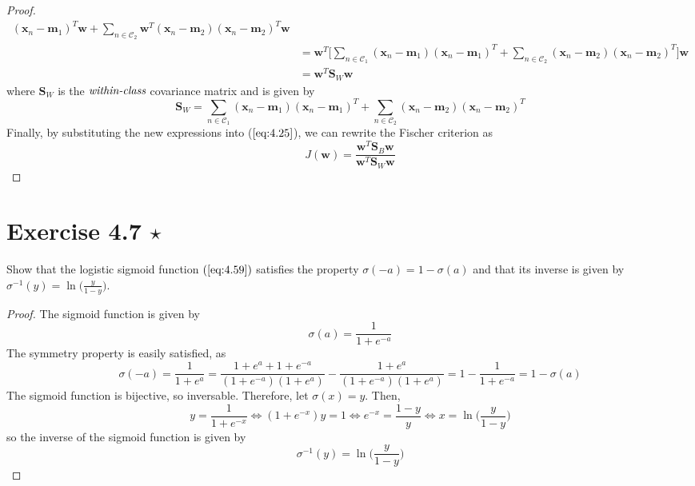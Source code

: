 \begin{proof}
\begin{align*}
            (\mathbf{x}_n - \mathbf{m}_1)^T\mathbf{w}
            + \sum_{n \in \mathcal{C}_2} \mathbf{w}^T(\mathbf{x}_n - \mathbf{m}_2)
            (\mathbf{x}_n - \mathbf{m}_2)^T\mathbf{w} \\
        &= \mathbf{w}^T \bigg[\sum_{n \in \mathcal{C}_1} 
            (\mathbf{x}_n - \mathbf{m}_1)(\mathbf{x}_n - \mathbf{m}_1)^T
            + \sum_{n \in \mathcal{C}_2}  
            (\mathbf{x}_n - \mathbf{m}_2)(\mathbf{x}_n - \mathbf{m}_2)^T
            \bigg]\mathbf{w} \\
        &= \mathbf{w}^T\mathbf{S}_W\mathbf{w}
    \end{align*}
    where $\mathbf{S}_W$ is the $\emph{within-class}$ covariance matrix and is given by
    \begin{equation*}
        \mathbf{S}_W = 
           \sum_{n \in \mathcal{C}_1} 
            (\mathbf{x}_n - \mathbf{m}_1)(\mathbf{x}_n - \mathbf{m}_1)^T
            + \sum_{n \in \mathcal{C}_2}  
            (\mathbf{x}_n - \mathbf{m}_2)(\mathbf{x}_n - \mathbf{m}_2)^T
        \tag{4.28}\label{eq:4.28}
    \end{equation*}
    Finally, by substituting the new expressions into ($\ref{eq:4.25}$), we can rewrite
    the Fischer criterion as
    \begin{equation*}
        J(\mathbf{w}) = \frac{\mathbf{w}^T\mathbf{S}_B\mathbf{w}}{\mathbf{w}^T\mathbf{S}_W\mathbf{w}}
        \tag{4.26}\label{eq:4.26}
    \end{equation*}
\end{proof}

\section*{Exercise 4.7 $\star$}
Show that the logistic sigmoid function $(\ref{eq:4.59})$ satisfies the property
$\sigma(-a) = 1 - \sigma(a)$ and that its inverse is given by 
$\sigma^{-1}(y) = \ln\bigg(\displaystyle \frac{y}{1 - y}\bigg)$. 

\vspace{1em}

\begin{proof}
    The sigmoid function is given by
    \begin{equation*}
        \sigma(a) = \frac{1}{1 + e^{-a}}
        \tag{4.59}\label{eq:4.59}
    \end{equation*}
    The symmetry property is easily satisfied, as
    \begin{equation*}
        \sigma(-a) 
        = \frac{1}{1 + e^a} 
        = \frac{1 + e^a + 1 + e^{-a}}{(1 + e^{-a})(1 + e^a)}
        - \frac{1 + e^a}{(1 + e^{-a})(1 + e^a)}
        = 1 - \frac{1}{1 + e^{-a}} 
        = 1 - \sigma(a)
        \tag{4.60}\label{eq:4.60}
    \end{equation*}
    The sigmoid function is bijective, so inversable. Therefore, let $\sigma(x) = y$.
    Then,
    \[
        y = \frac{1}{1 + e^{-x}} 
        \iff (1 + e^{-x})y = 1 
        \iff e^{-x} = \frac{1 - y}{y} 
        \iff x = \ln\bigg(\frac{y}{1-y}\bigg)
    \] 
    so the inverse of the sigmoid function is given by
    \[
        \sigma^{-1}(y) = \ln\bigg(\frac{y}{1 - y}\bigg)
    \] 
\end{proof}

